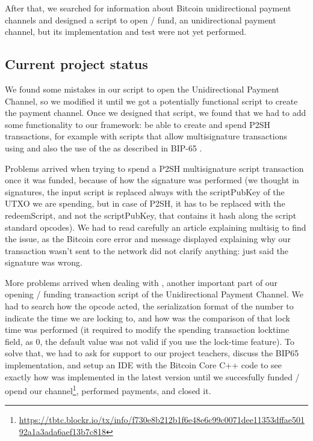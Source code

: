 After that, we searched for information about Bitcoin unidirectional payment channels and designed a script to open / fund, an unidirectional payment channel, but its implementation and test were not yet performed.

\subsection{Current project status}
We found some mistakes in our script to open the Unidirectional Payment Channel, so we modified it until we got a potentially functional script to create the payment channel. Once we designed that script, we found that we had to add some functionality to our framework: be able to create and spend P2SH transactions, for example with scripts that allow multisignature transactions using  and also the use of the  as described in BIP-65 \cite{bip-65:online}.

Problems arrived when trying to spend a P2SH multisignature script transaction once it was funded, because of how the signature was performed (we thought in signatures, the input script is replaced always with the scriptPubKey of the UTXO we are spending, but in case of P2SH, it has to be replaced with the redeemScript, and not the scriptPubKey, that contains it hash along the script standard opcodes). We had to read carefully an article explaining multisig\cite{soroushjp_multisig:online} to find the issue, as the Bitcoin core error and message displayed explaining why our transaction wasn't sent to the network did not clarify anything: just said the signature was wrong.

More problems arrived when dealing with , another important part of our opening / funding transaction script of the Unidirectional Payment Channel. We had to search how the opcode acted, the serialization format of the number to indicate the time we are locking to, and how was the comparison of that lock time was performed (it required to modify the spending transaction locktime field, as 0, the default value was not valid if you use the lock-time feature). To solve that, we had to ask for support to our project teachers, discuss the BIP65\cite{bip-65:online} implementation, and setup an IDE\cite{bitcoin-ide-lopp:online} with the Bitcoin Core \cite{bitcoin-core:online} C++ code to see exactly how was implemented in the latest version until we succesfully funded / opend our channel\footnote{\url{https://tbtc.blockr.io/tx/info/f730e8b212b1f6e48e6c99c0071dee11353dffae50192a1a3ada6aef13b7c818}}, performed payments, and closed it.

